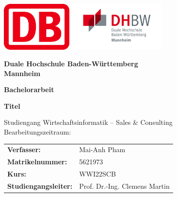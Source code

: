 \begin{titlepage}
    \thispagestyle{empty}
  
    \begin{center}
      \vspace*{-1cm}
      \includegraphics[height=2.5cm]{bilder/DB_logo_red_filled_1000px_rgb.png}
      \hfill
      \includegraphics[height=2.5cm]{bilder/DHBW_MA_Logo.jpg}
  
      \vspace{1.5cm}
  
      {\Large\bfseries
      Duale Hochschule Baden-Württemberg\\
      Mannheim}
  
      \vspace{1cm}
  
      {\large\bfseries Bachelorarbeit}
  
      \vspace{1cm}
  
      {\LARGE\bfseries
      Titel
      }
  
      \vspace{1cm}
  
      {\large
      Studiengang Wirtschaftsinformatik – Sales \& Consulting\\
      Bearbeitungszeitraum: 
      }
  
      \vfill
  
      \begin{tabular}{@{}ll}
      \textbf{Verfasser:} & Mai-Anh Pham \\
      \textbf{Matrikelnummer:} & 5621973 \\
      \textbf{Kurs:} & WWI22SCB \\
      \textbf{Studiengangsleiter:} & Prof. Dr.-Ing. Clemens Martin \\
      \end{tabular}
  
      \vspace{1cm}
  

\end{center}
\end{titlepage}
